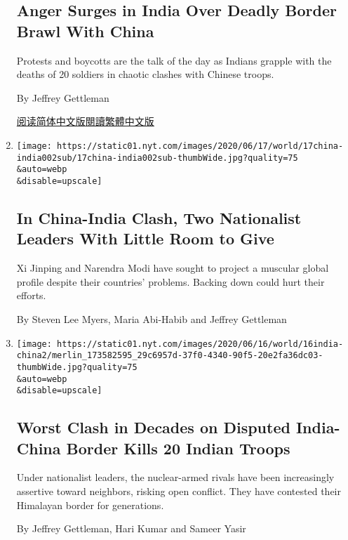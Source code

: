 \begin{enumerate}
  \hypertarget{anger-surges-in-india-over-deadly-border-brawl-with-china}{%
  \subsection{Anger Surges in India Over Deadly Border Brawl With
  China}\label{anger-surges-in-india-over-deadly-border-brawl-with-china}}

  Protests and boycotts are the talk of the day as Indians grapple with
  the deaths of 20 soldiers in chaotic clashes with Chinese troops.

  By Jeffrey Gettleman

  \href{https://cn.nytimes.com/world/20200619/india-china-border/}{阅读简体中文版}\href{https://cn.nytimes.com/world/20200619/india-china-border/zh-hant}{閱讀繁體中文版}
\item
  \href{/2020/06/17/world/asia/china-india-border.html}{}

  \texttt{[image: https://static01.nyt.com/images/2020/06/17/world/17china-india002sub/17china-india002sub-thumbWide.jpg?quality=75\\\&auto=webp\\\&disable=upscale]}

  \hypertarget{in-china-india-clash-two-nationalist-leaders-with-little-room-to-give}{%
  \subsection{In China-India Clash, Two Nationalist Leaders With Little
  Room to
  Give}\label{in-china-india-clash-two-nationalist-leaders-with-little-room-to-give}}

  Xi Jinping and Narendra Modi have sought to project a muscular global
  profile despite their countries' problems. Backing down could hurt
  their efforts.

  By Steven Lee Myers, Maria Abi-Habib and Jeffrey Gettleman
\item
  \href{/2020/06/16/world/asia/indian-china-border-clash.html}{}

  \texttt{[image: https://static01.nyt.com/images/2020/06/16/world/16india-china2/merlin\_173582595\_29c6957d-37f0-4340-90f5-20e2fa36dc03-thumbWide.jpg?quality=75\\\&auto=webp\\\&disable=upscale]}

  \hypertarget{worst-clash-in-decades-on-disputed-india-china-border-kills-20-indian-troops}{%
  \subsection{Worst Clash in Decades on Disputed India-China Border
  Kills 20 Indian
  Troops}\label{worst-clash-in-decades-on-disputed-india-china-border-kills-20-indian-troops}}

  Under nationalist leaders, the nuclear-armed rivals have been
  increasingly assertive toward neighbors, risking open conflict. They
  have contested their Himalayan border for generations.

  By Jeffrey Gettleman, Hari Kumar and Sameer Yasir
\end{enumerate}

